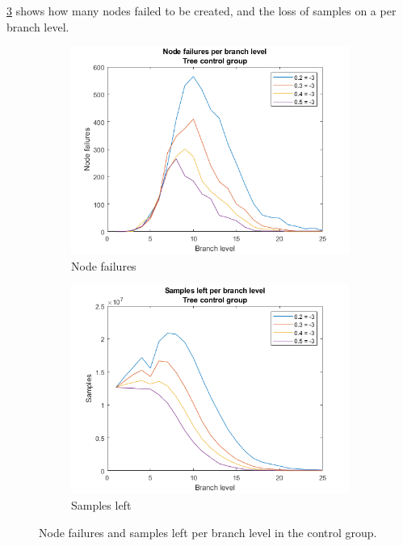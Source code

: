 \cref{fig:tree:treecontrolnodesample} shows how many nodes failed to be created, and the loss of samples on a per branch level.

\begin{figure}
    \centering
    \begin{subfigure}[b]{.45\textwidth}
        \centering
        \includegraphics[width=\textwidth]{figures/treecontrolnodefail.png}
        \caption{Node failures}
        \label{sfig:tree:treecontrolnode}
    \end{subfigure}
    \hfill
    \begin{subfigure}[b]{.45\textwidth}
        \centering
        \includegraphics[width=\textwidth]{figures/treecontrolsampleloss.png}
        \caption{Samples left}
        \label{sfig:tree:treecontrolsample}
    \end{subfigure}
    \caption{Node failures and samples left per branch level in the control group.}
    \label{fig:tree:treecontrolnodesample}
\end{figure}

